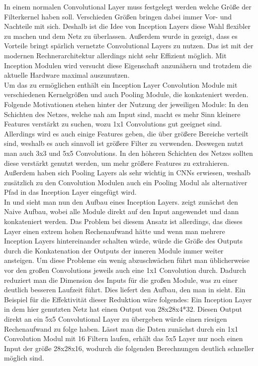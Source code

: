 \documentclass[runningheads,a4paper]{llncs}[2015/06/24]
\begin{document}
In einem normalen Convolutional Layer muss festgelegt werden welche Größe der Filterkernel haben soll. Verschieden Größen bringen dabei immer Vor- und Nachteile mit sich. Deshalb ist die Idee von Inception Layers diese Wahl flexibler zu machen und dem Netz zu überlassen. Außerdem wurde in \cite{sparse_paper} gezeigt, dass es Vorteile bringt spärlich vernetzte Convolutional Layers zu nutzen. Das ist mit der modernen Rechnerarchitektur allerdings nicht sehr Effizient möglich. Mit Inception Modulen wird versucht diese Eigenschaft anzunähern und trotzdem die aktuelle Hardware maximal auszunutzen.\\
Um das zu ermöglichen enthält ein Inception Layer Convolution Module mit verschiedenen Kernelgrößen und auch Pooling Module, die konkateniert werden. Folgende Motivationen stehen hinter der Nutzung der jeweiligen Module: In den Schichten des Netzes, welche nah am Input sind, macht es mehr Sinn kleinere Features verstärkt zu suchen, wozu 1x1 Convolutions gut geeignet sind. Allerdings wird es auch einige Features geben, die über größere Bereiche verteilt sind, weshalb es auch sinnvoll ist größere Filter zu verwenden. Deswegen nutzt man auch 3x3 und 5x5 Convolutions. In den höheren Schichten des Netzes sollten diese verstärkt genutzt werden, um mehr größere Features zu extrahieren. Außerdem haben sich Pooling Layers als sehr wichtig in CNNs erwiesen, weshalb zusätzlich zu den Convolution Modulen auch ein Pooling Modul als alternativer Pfad in das Inception Layer eingefügt wird.\\
In  und  sieht man nun den Aufbau eines Inception Layers.  zeigt zunächst den Naive Aufbau, wobei alle Module direkt auf den Input angewendet und dann konkateniert werden. Das Problem bei diesem Ansatz ist allerdings, das dieses Layer einen extrem hohen Rechenaufwand hätte und wenn man mehrere Inception Layers hintereinander schalten würde, würde die Größe des Outputs durch die Konkatenation der Outputs der inneren Module immer weiter ansteigen.
Um diese Probleme ein wenig abzuschwächen führt man üblicherweise vor den großen Convolutions jeweils auch eine 1x1 Convolution durch. Dadurch reduziert man die Dimension des Inputs für die großen Module, was zu einer deutlich besseren Laufzeit führt. Dies liefert den Aufbau, den man in  sieht. Ein Beispiel für die Effektivität dieser Reduktion wäre folgendes: Ein Inception Layer in dem hier genutzten Netz hat einen Output von 28x28x4*32. Diesen Output direkt an ein 5x5 Convolutional Layer zu übergeben würde einen riesigen Rechenaufwand zu folge haben. Lässt man die Daten zunächst durch ein 1x1 Convolution Modul mit 16 Filtern laufen, erhält das 5x5 Layer nur noch einen Input der größe 28x28x16, wodurch die folgenden Berechnungen deutlich schneller möglich sind.\\
\end{document}
